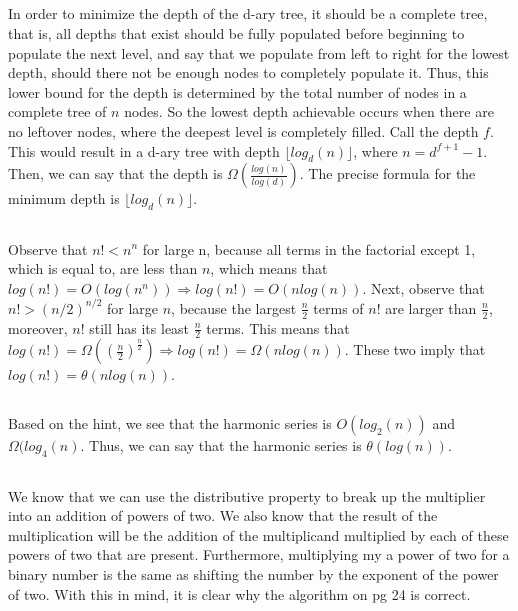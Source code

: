 \documentclass{article}
\newcommand\floor[1]{\lfloor#1\rfloor}
\begin{document}
\subsection{}In order to minimize the depth of the d-ary tree, it should be a complete tree, that is, all depths that exist should be fully populated before beginning to populate the next level, and say that we populate from left to right for the lowest depth, should there not be enough nodes to completely populate it. Thus, this lower bound for the depth is determined by the total number of nodes in a complete tree of $n$ nodes. So the lowest depth achievable occurs when there are no leftover nodes, where the deepest level is completely filled. Call the depth $f$. This would result in a d-ary tree with depth $\floor{log_d(n)}$, where $n=d^{f+1}-1$. Then, we can say that the depth is $\Omega(\frac{log(n)}{log(d)})$. The precise formula for the minimum depth is $\floor{log_d(n)}$.
\subsection{} Observe that $n!<n^n$ for large n, because all terms in the factorial except 1, which is equal to, are less than $n$, which means that $log(n!)=O(log(n^n)) \Rightarrow log(n!)=O(nlog(n))$. Next, observe that $n! > (n/2)^{n/2}$ for large $n$, because the largest $\frac{n}{2}$ terms of $n!$ are larger than $\frac{n}{2}$, moreover, $n!$ still has its least $\frac{n}{2}$ terms. This means that $log(n!)=\Omega((\frac{n}{2})^{\frac{n}{2}}) \Rightarrow log(n!)=\Omega(nlog(n))$. These two imply that $log(n!)=\theta(nlog(n))$. 
\subsection{}Based on the hint, we see that the harmonic series is $O(log_2(n))$ and $\Omega(log_4(n)$. Thus, we can say that the harmonic series is $\theta(log(n))$.
\subsection{}We know that we can use the distributive property to break up the multiplier into an addition of powers of two. We also know that the result of the multiplication will be the addition of the multiplicand multiplied by each of these powers of two that are present. Furthermore, multiplying my a power of two for a binary number is the same as shifting the number by the exponent of the power of two. With this in mind, it is clear why the algorithm on pg 24 is correct. 
\end{document}
